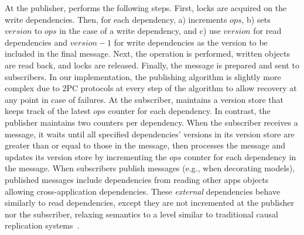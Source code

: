 At the publisher, \synapse performs the following steps.  First,
locks are acquired on the write dependencies. Then, 
for each dependency, a) \synapse increments $ops$, b) sets $version$ to $ops$
in the case of a write dependency, and c) use $version$ for read dependencies
and $version - 1$ for write dependencies as the version to be included
in the final message.  Next, the operation is performed, written objects are
read back, and locks are released. Finally, the message is prepared and sent
to subscribers.  In our implementation, the publishing algorithm is slightly
more complex due to 2PC protocols at every step of the algorithm to allow
recovery at any point in case of failures.  At the subscriber, \synapse
maintains a version store that keeps track of the latest $ops$ counter for
each dependency. In contrast, the publisher maintains two
counters per dependency.  When the subscriber receives a message, it waits
until all specified dependencies' versions in its version store are greater than
or equal to those in the message,
then processes the message and updates its version store
by incrementing the $ops$ counter for each dependency in the message. 
When subscribers publish messages (e.g., when decorating models), published
messages include dependencies from reading other apps objects allowing
cross-application dependencies.  These {\em external} dependencies behave
similarly to read dependencies, except they are not incremented at the publisher
nor the subscriber, relaxing semantics to a level similar to traditional causal
replication systems~\cite{cops,eiger}.

